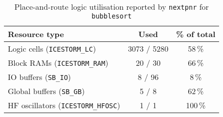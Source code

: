 \documentclass[a4paper,10pt]{article}
\begin{document}
\begin{table}[H]
    \centering
    \begin{tabularx}{0.6\textwidth}{X c c}
        \toprule
        Resource type & Used & \% of total \\ \midrule
        Logic cells (\texttt{ICESTORM\_LC}) & 3073 / 5280 & 58\,\% \\
        Block RAMs (\texttt{ICESTORM\_RAM}) & 20 / 30 & 66\,\% \\
        IO buffers (\texttt{SB\_IO}) & 8 / 96 & 8\,\% \\
        Global buffers (\texttt{SB\_GB}) & 5 / 8 & 62\,\% \\
        HF oscillators (\texttt{ICESTORM\_HFOSC}) & 1 / 1 & 100\,\% \\
        \bottomrule
    \end{tabularx}
    \caption{Place-and-route logic utilisation reported by 
    \texttt{nextpnr} for \texttt{bubblesort}}
    \label{tab:bubblesort_pnr_report}
\end{table}
\end{document}
